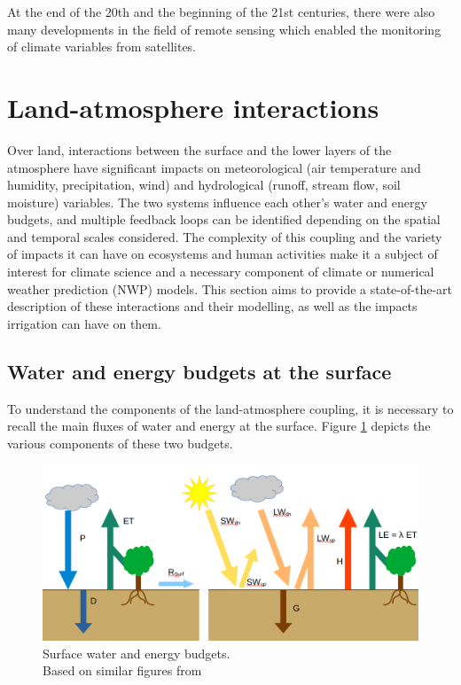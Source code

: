 At the end of the 20th and the beginning of the 21st centuries, there were also many developments in the field of remote sensing which enabled the monitoring of climate variables from satellites. 



\section{Land-atmosphere interactions}

Over land, interactions between the surface and the lower layers of the atmosphere have significant impacts on meteorological (air temperature and humidity, precipitation, wind) and hydrological (runoff, stream flow, soil moisture) variables. The two systems influence each other's water and energy budgets, and multiple feedback loops can be identified depending on the spatial and temporal scales considered. The complexity of this coupling and the variety of impacts it can have on ecosystems and human activities make it a subject of interest for climate science and a necessary component of climate or numerical weather prediction (NWP) models. This section aims to provide a state-of-the-art description of these interactions and their modelling, as well as the impacts irrigation can have on them.

\subsection{Water and energy budgets at the surface}
To understand the components of the land-atmosphere coupling, it is necessary to recall the main fluxes of water and energy at the surface. 
Figure \ref{fig:budgets} depicts the various components of these two budgets.

\begin{figure}[ht]
    \centering
    \includegraphics[width=\textwidth]{images/budgets.png}
    \caption{Surface water and energy budgets. \\Based on similar figures from \citet{seneviratne_investigating_2010}%
    }
    \label{fig:budgets}
\end{figure}

